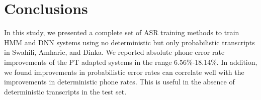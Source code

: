 \documentclass[a4paper]{article}
\begin{document}
\vspace{-3mm}
\section{Conclusions}
In this study, we presented a complete set of ASR training methods to train HMM and DNN systems using no deterministic but only probabilistic transcripts in Swahili, Amharic, and Dinka. We reported absolute phone error rate improvements of the PT adapted systems in the range 6.56\%-18.14\%. In addition, we found improvements in probabilistic error rates can correlate well with the improvements in deterministic phone rates. This is useful in the absence of deterministic transcripts in the test set.


\clearpage
\newpage
\eightpt



\end{document}
